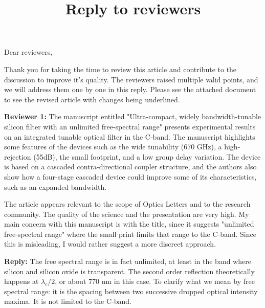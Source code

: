 \documentclass[]{letter}
\title{Reply to reviewers}
\begin{document}

Dear reviewers,

Thank you for taking the time to review this article and contribute to the discussion to improve it's quality. The reviewers raised multiple valid points, and we will address them one by one in this reply. Please see the attached document to see the revised article with changes being underlined.

\textbf{Reviewer 1:} The manuscript entitled "Ultra-compact, widely bandwidth-tunable silicon filter with an unlimited free-spectral range" presents experimental results on an integrated tunable optical filter in the C-band. The manuscript highlights some features of the devices such as the wide tunability (670 GHz), a high-rejection (55dB), the small footprint, and a low group delay variation.
The device is based on a cascaded contra-directional coupler structure, and the authors also show how a four-stage cascaded device could improve some of its characteristics, such as an expanded bandwidth.

The article appears relevant to the scope of Optics Letters and to the research community. The quality of the science and the presentation are very high.
My main concern with this manuscript is with the title, since it suggests "unlimited free-spectral range" where the small print limits that range to the C-band. Since this is misleading, I would rather suggest a more discreet approach.

\textbf{Reply:} The free spectral range is in fact unlimited, at least in the band where silicon and silicon oxide is transparent. The second order reflection theoretically happens at $\lambda_c/2$, or about 770 nm in this case. 
To clarify what we mean by free spectral range: it is the spacing between two successive dropped optical intensity maxima. It is not limited to the C-band.
\end{document}
